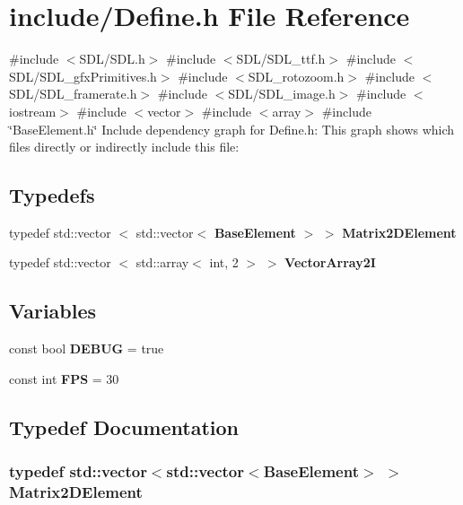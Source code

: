 \section{include/\-Define.h \-File \-Reference}
\label{_define_8h}
{\ttfamily \#include $<$\-S\-D\-L/\-S\-D\-L.\-h$>$}\*
{\ttfamily \#include $<$\-S\-D\-L/\-S\-D\-L\-\_\-ttf.\-h$>$}\*
{\ttfamily \#include $<$\-S\-D\-L/\-S\-D\-L\-\_\-gfx\-Primitives.\-h$>$}\*
{\ttfamily \#include $<$\-S\-D\-L\-\_\-rotozoom.\-h$>$}\*
{\ttfamily \#include $<$\-S\-D\-L/\-S\-D\-L\-\_\-framerate.\-h$>$}\*
{\ttfamily \#include $<$\-S\-D\-L/\-S\-D\-L\-\_\-image.\-h$>$}\*
{\ttfamily \#include $<$iostream$>$}\*
{\ttfamily \#include $<$vector$>$}\*
{\ttfamily \#include $<$array$>$}\*
{\ttfamily \#include \char`\"{}\-Base\-Element.\-h\char`\"{}}\*
\-Include dependency graph for \-Define.\-h\-:
\-This graph shows which files directly or indirectly include this file\-:
\subsection*{\-Typedefs}
\begin{DoxyCompactItemize}
\item 
typedef std\-::vector\*
$<$ std\-::vector$<$ {\bf \-Base\-Element} $>$ $>$ {\bf \-Matrix2\-D\-Element}
\item 
typedef std\-::vector\*
$<$ std\-::array$<$ int, 2 $>$ $>$ {\bf \-Vector\-Array2\-I}
\end{DoxyCompactItemize}
\subsection*{\-Variables}
\begin{DoxyCompactItemize}
\item 
const bool {\bf \-D\-E\-B\-U\-G} = true
\item 
const int {\bf \-F\-P\-S} = 30
\end{DoxyCompactItemize}


\subsection{\-Typedef \-Documentation}
\subsubsection[{\-Matrix2\-D\-Element}]{\setlength{\rightskip}{0pt plus 5cm}typedef std\-::vector$<$std\-::vector$<${\bf \-Base\-Element}$>$ $>$ {\bf \-Matrix2\-D\-Element}}\label{_define_8h_af553b5023bf0c32010fd1d3cbdc3c177}


